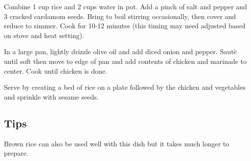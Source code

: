 \tab Combine 1 cup rice and 2 cups water in pot. Add a pinch of salt and pepper and 3 cracked cardamom seeds. Bring to boil stirring occasionally, then cover and reduce to simmer. Cook for 10-12 minutes (this timing may need adjusted based on stove and heat setting). 

\tab In a large pan, lightly drizzle olive oil and add diced onion and pepper. Saut\`{e} until soft then move to edge of pan and add contents of chicken and marinade to center. Cook until chicken is done. 

\tab Serve by creating a bed of rice on a plate followed by the chicken and vegetables and sprinkle with sesame seeds.

\subsection*{Tips}
Brown rice can also be used well with this dish but it takes much longer to prepare. 

	